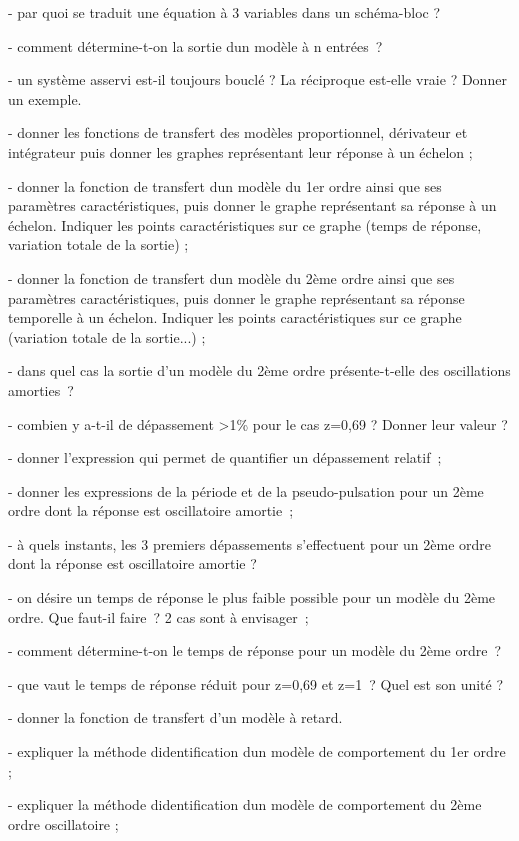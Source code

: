 - par quoi se traduit une équation à 3 variables dans un schéma-bloc ?

- comment détermine-t-on la sortie d\textquotesingle un modèle à n entrées~?

- un système asservi est-il toujours bouclé ? La réciproque est-elle vraie ? Donner un exemple.

- donner les fonctions de transfert des modèles proportionnel, dérivateur et intégrateur puis donner les graphes représentant leur réponse à un échelon ;

- donner la fonction de transfert d\textquotesingle un modèle du 1er ordre ainsi que ses paramètres caractéristiques, puis donner le graphe représentant sa réponse à un échelon. Indiquer les points caractéristiques sur ce graphe (temps de réponse, variation totale de la sortie) ;

- donner la fonction de transfert d\textquotesingle un modèle du 2ème ordre ainsi que ses paramètres caractéristiques, puis donner le graphe représentant sa réponse temporelle à un échelon. Indiquer les points caractéristiques sur ce graphe (variation totale de la sortie...) ;

- dans quel cas la sortie d'un modèle du 2ème ordre présente-t-elle des oscillations amorties~?

- combien y a-t-il de dépassement \textgreater1\% pour le cas z=0,69 ? Donner leur valeur ?

- donner l'expression qui permet de quantifier un dépassement relatif~;

- donner les expressions de la période et de la pseudo-pulsation pour un 2ème ordre dont la réponse est oscillatoire amortie~;

- à quels instants, les 3 premiers dépassements s'effectuent pour un 2ème ordre dont la réponse est oscillatoire amortie ?

- on désire un temps de réponse le plus faible possible pour un modèle du 2ème ordre. Que faut-il faire~? 2 cas sont à envisager~;

- comment détermine-t-on le temps de réponse pour un modèle du 2ème ordre~?

- que vaut le temps de réponse réduit pour z=0,69 et z=1~? Quel est son unité ?

- donner la fonction de transfert d'un modèle à retard.

- expliquer la méthode d\textquotesingle identification d\textquotesingle un modèle de comportement du 1er ordre ;

- expliquer la méthode d\textquotesingle identification d\textquotesingle un modèle de comportement du 2ème ordre oscillatoire ;

